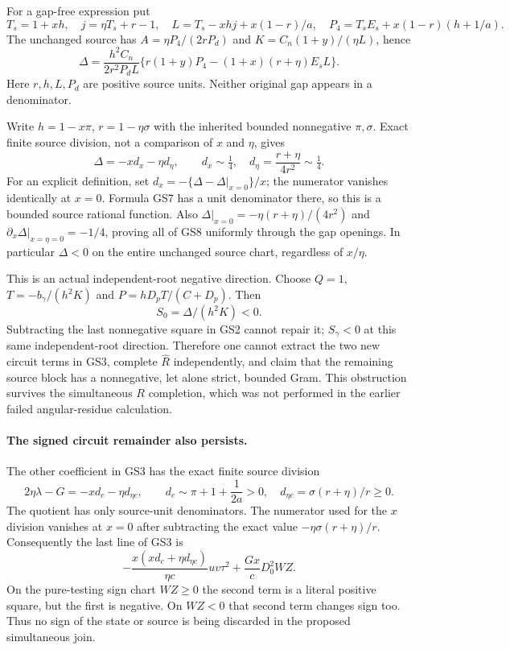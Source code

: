 For a gap-free expression put
\[
 T_s=1+xh,\quad j=\eta T_s+r-1,\quad
 L=T_s-xhj+x(1-r)/a,\quad
 P_4=T_sE_s+x(1-r)(h+1/a).
\]
The unchanged source has $A=\eta P_4/(2rP_d)$ and
$K=C_n(1+y)/(\eta L)$, hence
\[
 \boxed{\quad
 \Delta=\frac{h^2C_n}{2r^2P_dL}
       \{r(1+y)P_4-(1+x)(r+\eta)E_sL\}.
 \quad}                                                     \tag{GS7}
\]
Here $r,h,L,P_d$ are positive source units. Neither original gap
appears in a denominator.

Write $h=1-x\pi$, $r=1-\eta\sigma$ with the inherited bounded
nonnegative $\pi,\sigma$. Exact finite source division, not a
comparison of $x$ and $\eta$, gives
\[
 \boxed{\quad \Delta=-x d_x-\eta d_\eta,\qquad
 d_x\sim\tfrac14,\quad
 d_\eta=\frac{r+\eta}{4r^2}\sim\tfrac14.
 \quad}                                                     \tag{GS8}
\]
For an explicit definition, set
$d_x=-\{\Delta-\Delta|_{x=0}\}/x$; the numerator vanishes identically
at $x=0$. Formula GS7 has a unit denominator there, so this is a
bounded source rational function. Also
$\Delta|_{x=0}=-\eta(r+\eta)/(4r^2)$ and
$\partial_x\Delta|_{x=\eta=0}=-1/4$, proving all of GS8 uniformly
through the gap openings. In particular $\Delta<0$ on the entire
unchanged source chart, regardless of $x/\eta$.

This is an actual independent-root negative direction. Choose
$Q=1$, $T=-b_\gamma/(h^2K)$ and
$P=hD_pT/(C+D_p)$. Then
\[
                      S_0=\Delta/(h^2K)<0.
\]
Subtracting the last nonnegative square in GS2 cannot repair it;
$S_\gamma<0$ at this same independent-root direction. Therefore
one cannot extract the two new circuit terms in GS3, complete
$\widehat R$ independently, and claim that the remaining source
block has a nonnegative, let alone strict, bounded Gram. This
obstruction survives the simultaneous $R$ completion, which was
not performed in the earlier failed angular-residue calculation.

\paragraph{The signed circuit remainder also persists.}
The other coefficient in GS3 has the exact finite source division
\[
 2\eta\lambda-G=-x d_c-\eta d_{\eta c},\qquad
 d_c\sim\pi+1+\frac1{2a}>0,\quad
 d_{\eta c}=\sigma(r+\eta)/r\ge0.          \tag{GS9}
\]
The quotient has only source-unit denominators. The numerator used
for the $x$ division vanishes at $x=0$ after subtracting the exact
value $-\eta\sigma(r+\eta)/r$. Consequently the last line of GS3 is
\[
 -\frac{x(xd_c+\eta d_{\eta c})}{\eta c}uv\tau^2
                   +\frac{Gx}{c}D_0^2WZ.           \tag{GS10}
\]
On the pure-testing sign chart $WZ\ge0$ the second term is a literal
positive square, but the first is negative. On $WZ<0$ that second
term changes sign too. Thus no sign of the state or source is being
discarded in the proposed simultaneous join.

